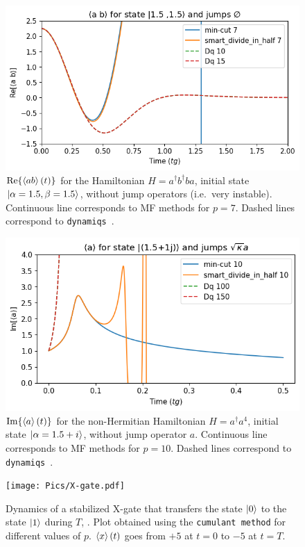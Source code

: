 \begin{center}
    \begin{figure}[h!]
      \centering
      \includegraphics[width=0.9\linewidth]{Pics/Eg_H_CrossKerr_Lossless_Compare_Min_Half.pdf}
      \caption{$\Re{\left\langle a b \right\rangle(t)}$ for the Hamiltonian $H = a^\dagger b^\dagger b a$, initial state $\ket{\alpha = 1.5, \beta = 1.5}$, without jump operators (i.e.\@~very instable). Continuous line corresponds to MF methods for $p=7$. Dashed lines correspond to \texttt{dynamiqs}~\cite{dynamiqs}.}
      \label{fig:Eg_H_CrossKerr_Lossless_Compare_Min_Half}
    \end{figure}
\end{center}
\begin{center}
    \begin{figure}[h!]
      \centering
      \includegraphics[width=0.9\linewidth]{Pics/Eg_stab_AdagA4p10.pdf}
      \caption{$\Im{\left\langle a \right\rangle(t)}$ for the non-Hermitian Hamiltonian $H = a^\dagger a^4$, initial state $\ket{\alpha = 1.5+i}$, without jump operator $a$. Continuous line corresponds to MF methods for $p=10$. Dashed lines correspond to \texttt{dynamiqs}~\cite{dynamiqs}.}
      \label{fig:Eg_stab_AdagA4p10}
    \end{figure}
\end{center}

\begin{center}
    \begin{figure}[h!]
      \centering
      \texttt{[image: Pics/X-gate.pdf]}
      \caption{Dynamics of a stabilized X-gate that transfers the state $\ket{0}$ to the state $\ket{1}$ during $T$, \cite{jeremie-X-CX}. Plot obtained using the \texttt{cumulant method} for different values of $p$. $\left\langle x \right\rangle(t)$ goes from $+5$ at $t=0$ to $-5$ at $t=T$.}
      \label{fig:X-gate}
    \end{figure}
\end{center}